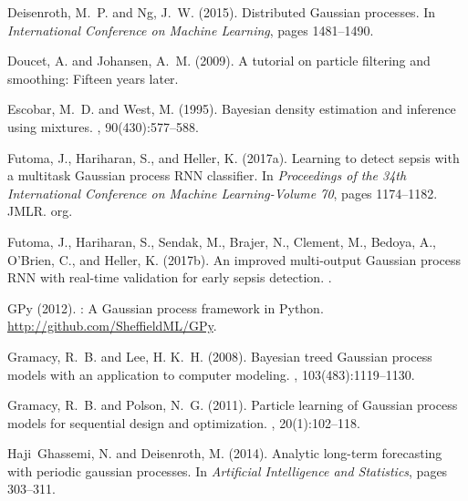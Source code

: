 \documentclass[12pt,letterpaper]{article}
\begin{document}
\begin{thebibliography}{}
Deisenroth, M.~P. and Ng, J.~W. (2015).
\newblock Distributed {G}aussian processes.
\newblock In {\em International Conference on Machine Learning}, pages
  1481--1490.

Doucet, A. and Johansen, A.~M. (2009).
\newblock A tutorial on particle filtering and smoothing: Fifteen years later.

Escobar, M.~D. and West, M. (1995).
\newblock Bayesian density estimation and inference using mixtures.
,
  90(430):577--588.

Futoma, J., Hariharan, S., and Heller, K. (2017a).
\newblock Learning to detect sepsis with a multitask {G}aussian process {RNN}
  classifier.
\newblock In {\em Proceedings of the 34th International Conference on Machine
  Learning-Volume 70}, pages 1174--1182. JMLR. org.

Futoma, J., Hariharan, S., Sendak, M., Brajer, N., Clement, M., Bedoya, A.,
  O'Brien, C., and Heller, K. (2017b).
\newblock An improved multi-output {G}aussian process {RNN} with real-time
  validation for early sepsis detection.
.

{GPy} (2012).
: A {G}aussian process framework in {P}ython.
\newblock \url{http://github.com/SheffieldML/GPy}.

Gramacy, R.~B. and Lee, H. K.~H. (2008).
\newblock Bayesian treed {G}aussian process models with an application to
  computer modeling.
,
  103(483):1119--1130.

Gramacy, R.~B. and Polson, N.~G. (2011).
\newblock Particle learning of {G}aussian process models for sequential design
  and optimization.
,
  20(1):102--118.

Haji~Ghassemi, N. and Deisenroth, M. (2014).
\newblock Analytic long-term forecasting with periodic gaussian processes.
\newblock In {\em Artificial Intelligence and Statistics}, pages 303--311.


\end{thebibliography}
\end{document}
